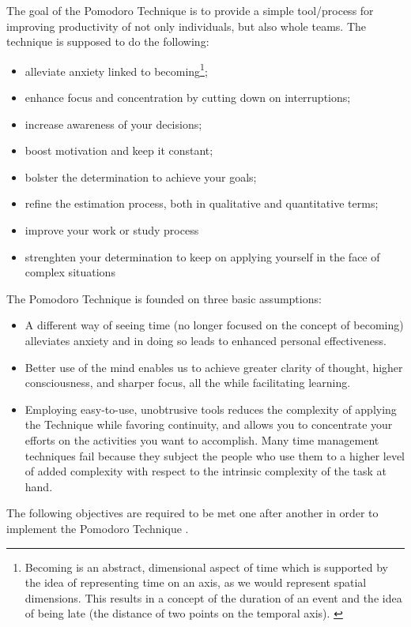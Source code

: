 \documentclass[11pt,singleside]{myfithesis2}
\begin{document}
The goal of the Pomodoro Technique is to provide a simple tool/process for improving productivity of not only individuals, but also whole teams. The technique is supposed to do the following: \cite{pomodoro}
\begin{itemize}
	\item alleviate anxiety linked to becoming\footnote{Becoming is an abstract, dimensional aspect of time which is supported by the idea of representing time on an axis,  as we would represent spatial dimensions. This results in a concept of the duration of an event and the idea of being late (the distance of two points on the temporal axis). \cite{pomodoro}};
	\item enhance focus and concentration by cutting down on interruptions;
	\item increase awareness of your decisions;
	\item boost motivation and keep it constant;
	\item bolster the determination to achieve your goals;
	\item refine the estimation process, both in qualitative and quantitative terms;
	\item improve your work or study process
	\item strenghten your determination to keep on applying yourself in the face of complex situations
\end{itemize}

The Pomodoro Technique is founded on three basic assumptions: \cite{pomodoro}
\begin{itemize}
	\item A different way of seeing time (no longer focused on the concept of becoming) alleviates anxiety and in doing so leads to enhanced personal effectiveness. 
	\item Better use of the mind enables us to achieve greater clarity of thought, higher consciousness, and sharper focus, all the while facilitating learning. 
	\item Employing easy-to-use, unobtrusive tools reduces the complexity of applying the Technique while favoring continuity, and allows you to concentrate your efforts on the 	activities you want to accomplish. Many time management techniques fail because they subject the people who use them to a higher level of added complexity with respect to the intrinsic complexity of the task at hand.
\end{itemize}

The following objectives are required to be met one after another in order to implement the Pomodoro Technique \cite{pomodoro}.
\end{document}
